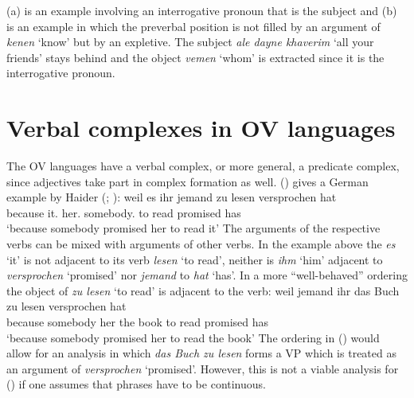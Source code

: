 \eal
{}
\zl
(a) is an example involving an interrogative pronoun that is the subject and (b) is an
example in which the preverbal position is not filled by an argument of \emph{kenen} `know' but by
an expletive. The subject \emph{ale dayne khaverim} `all your friends' stays behind and the object
\emph{vemen} `whom' is extracted since it is the interrogative pronoun.



\section{Verbal complexes in OV languages}


The OV languages have a verbal complex, or more general, a predicate complex, since adjectives take
part in complex formation as well. () gives a German example by Haider (\citeyear[]{Haider86c}; \citeyear[]{Haider90b}):
\ea
\gll weil es ihr jemand zu lesen versprochen hat\\
     because it.\ACC{} her.\DAT{} somebody.\NOM{} to read promised has\\\german
\glt `because somebody promised her to read it'
\z
The arguments of the respective verbs can be mixed with arguments of other verbs. In the example
above the \emph{es} `it' is not adjacent to its verb \emph{lesen} `to read', neither is \emph{ihm}
`him' adjacent to \emph{versprochen} `promised' nor \emph{jemand} to \emph{hat} `has'. In a more
``well-behaved'' ordering the object of \emph{zu lesen} `to read' is adjacent to the verb:
\ea
\gll weil    jemand   ihr das Buch zu lesen versprochen hat\\
     because somebody her the book to read  promised    has\\
\glt `because somebody promised her to read the book'
\z
The ordering in () would allow for an analysis in which \emph{das Buch zu lesen} forms a VP
which is treated as an argument of \emph{versprochen} `promised'. However, this is not a viable
analysis for () if one assumes that phrases have to be continuous.

